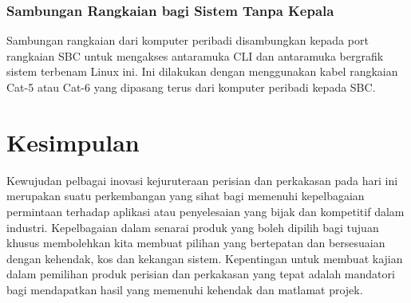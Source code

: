 \subsubsection{Sambungan Rangkaian bagi Sistem Tanpa Kepala}
Sambungan rangkaian dari komputer peribadi disambungkan kepada port rangkaian SBC untuk mengakses antaramuka CLI dan antaramuka bergrafik sistem terbenam Linux ini. Ini dilakukan dengan menggunakan kabel rangkaian Cat-5 atau Cat-6 yang dipasang terus dari komputer peribadi kepada SBC.

\section{Kesimpulan}
Kewujudan pelbagai inovasi kejuruteraan perisian dan perkakasan pada hari ini merupakan suatu perkembangan yang sihat bagi memenuhi kepelbagaian permintaan terhadap aplikasi atau penyelesaian yang bijak dan kompetitif dalam industri. Kepelbagaian dalam senarai produk yang boleh dipilih bagi tujuan khusus membolehkan kita membuat pilihan yang bertepatan dan bersesuaian dengan kehendak, kos dan kekangan sistem. Kepentingan untuk membuat kajian dalam pemilihan produk perisian dan perkakasan yang tepat adalah mandatori bagi mendapatkan hasil yang memenuhi kehendak dan matlamat projek.
